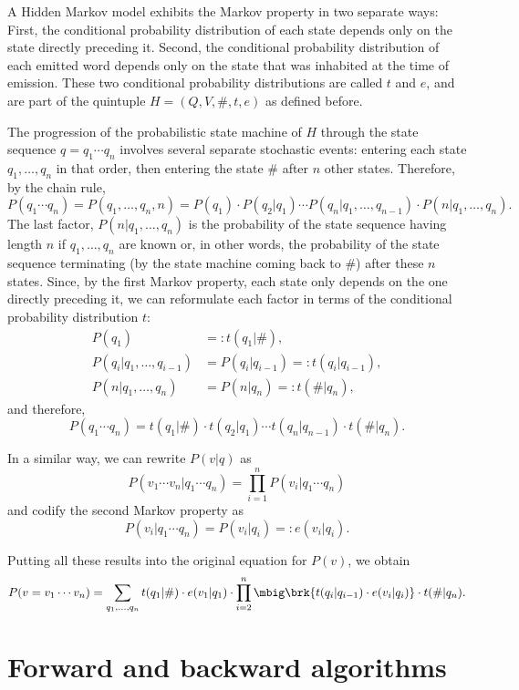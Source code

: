 A Hidden Markov model exhibits the Markov property in two separate ways: First,
the conditional probability distribution of each state depends only on the
state directly preceding it. Second, the conditional probability distribution
of each emitted word depends only on the state that was inhabited at the time
of emission. These two conditional probability distributions are called $t$ and
$e$, and are part of the quintuple $H=(Q,V,\#,t,e)$ as defined before.

The progression of the probabilistic state machine of $H$ through the state
sequence $q=q_1\cdots q_n$ involves several separate stochastic events:
entering each state $q_1,\ldots,q_n$ in that order, then entering the state
$\#$ after $n$ other states. Therefore, by the chain rule,
\[
 P(q_1\cdots q_n) = P(q_1,\ldots,q_n,n) = P(q_1) \cdot P(q_2|q_1) \cdots P(q_n|q_1,\ldots,q_{n-1}) \cdot P(n|q_1,\ldots,q_n).
\]
The last factor, $P(n|q_1,\ldots,q_n)$ is the probability of the state sequence
having length $n$ if $q_1,\ldots,q_n$ are known or, in other words, the
probability of the state sequence terminating (by the state machine coming back
to $\#$) after these $n$ states. Since, by the first Markov property, each
state only depends on the one directly preceding it, we can reformulate each
factor in terms of the conditional probability distribution $t$:
\begin{align*}
 P(q_1) &=: t(q_1|\#), \\
 P(q_i|q_1,\ldots,q_{i-1}) &= P(q_i|q_{i-1}) =: t(q_i|q_{i-1}), \\
 P(n|q_1,\ldots,q_n) &= P(n|q_n) =: t(\#|q_n),
\end{align*}
and therefore,
\[
 P(q_1\cdots q_n) = t(q_1|\#) \cdot t(q_2|q_1) \cdots t(q_n|q_{n-1}) \cdot t(\#|q_n).
\]

In a similar way, we can rewrite $P(v|q)$ as
\[
 P(v_1\cdots v_n|q_1\cdots q_n) = \prod_{i=1}^n P(v_i|q_1\cdots q_n)
\]
and codify the second Markov property as
\[
 P(v_i|q_1\cdots q_n) = P(v_i|q_i) =: e(v_i|q_i).
\]

Putting all these results into the original equation for $P(v)$, we obtain
\[
 P(v=v_1\cdots v_n) = \sum_{q_1,\ldots,q_n} t(q_1|\#) \cdot e(v_1|q_1) \cdot \prod_{i=2}^n \mbig\brk{t(q_i|q_{i-1}) \cdot e(v_i|q_i)} \cdot t(\#|q_n).
\]

\section{Forward and backward algorithms}

